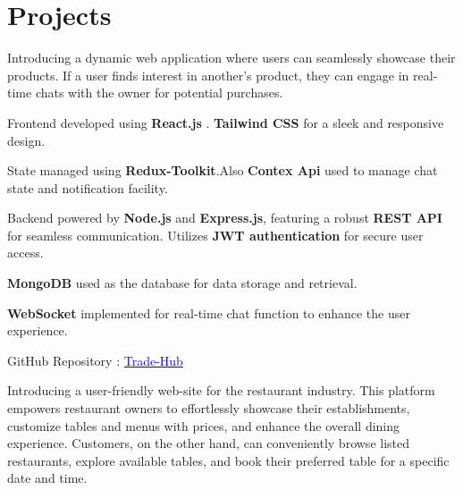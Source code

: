 \documentclass{deedy-resume-openfont}
\begin{document}
\begin{minipage}[t]{0.66\textwidth} 


\section{Projects}




\vspace{\topsep} %
\begin{tightemize}
\item Introducing a dynamic web application where users can seamlessly showcase their products. If a user finds interest in another's product, they can engage in real-time chats with the owner for potential purchases.
\item Frontend developed using \textbf{React.js} .  \textbf{Tailwind CSS} for a sleek and responsive design.
\item State managed using \textbf{Redux-Toolkit}.Also \textbf{Contex Api} used to manage chat state and notification facility.

 
\item Backend powered by \textbf{Node.js} and \textbf{Express.js}, featuring a robust \textbf{REST API} for seamless communication. Utilizes \textbf{JWT authentication} for secure user access.



\item \textbf{MongoDB} used as the database for data storage and retrieval.

\item \textbf{WebSocket} implemented for real-time chat function to enhance the user experience.
\usepackage{hyperref}

\item GitHub Repository : \href{https://github.com/RudraSarkar5/Trade-Hub.git}{\textcolor{blue}{ Trade-Hub}}


\end{tightemize}
\sectionsep


\begin{tightemize}
\item Introducing a user-friendly web-site for the restaurant industry. This platform empowers restaurant owners to effortlessly showcase their establishments, customize tables and  menus with prices, and enhance the overall dining experience. Customers, on the other hand, can conveniently browse listed restaurants, explore available tables, and book their preferred table for a specific date and time.


\end{tightemize}
\end{minipage}
\end{document}
